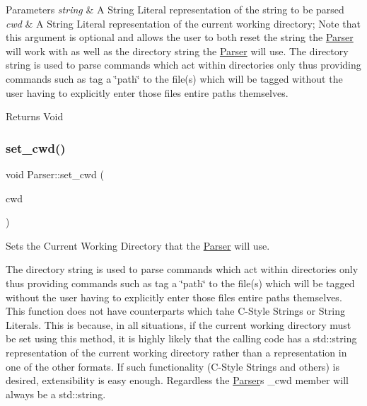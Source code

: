 \begin{DoxyParams}{Parameters}
{\em string} & A String Literal representation of the string to be parsed\\
\hline
{\em cwd} & A String Literal representation of the current working directory; Note that this argument is optional and allows the user to both reset the string the \mbox{\hyperlink{class_parser}{Parser}} will work with as well as the directory string the \mbox{\hyperlink{class_parser}{Parser}} will use. The directory string is used to parse commands which act within directories only thus providing commands such as \textquotesingle{}tag\textquotesingle{} a \char`\"{}path\char`\"{} to the file(s) which will be tagged without the user having to explicitly enter those file\textquotesingle{}s entire paths themselves.\\
\hline
\end{DoxyParams}
\begin{DoxyReturn}{Returns}
Void 
\end{DoxyReturn}
\mbox{\label{class_parser_a086f1431a0cac193fb6ff4506ba5c701}} 
\subsubsection{\texorpdfstring{set\+\_\+cwd()}{set\_cwd()}}
{\footnotesize\ttfamily void Parser\+::set\+\_\+cwd (\begin{DoxyParamCaption}\item[{std\+::string}]{cwd }\end{DoxyParamCaption})}



Sets the Current Working Directory that the \mbox{\hyperlink{class_parser}{Parser}} will use. 

The directory string is used to parse commands which act within directories only thus providing commands such as \textquotesingle{}tag\textquotesingle{} a \char`\"{}path\char`\"{} to the file(s) which will be tagged without the user having to explicitly enter those file\textquotesingle{}s entire paths themselves. This function does not have counterparts which tahe C-\/\+Style Strings or String Literals. This is because, in all situations, if the current working directory must be set using this method, it is highly likely that the calling code has a std\+::string representation of the current working directory rather than a representation in one of the other formats. If such functionality (C-\/\+Style Strings and others) is desired, extensibility is easy enough. Regardless the \mbox{\hyperlink{class_parser}{Parser}}\textquotesingle{}s \+\_\+cwd member will always be a std\+::string.


